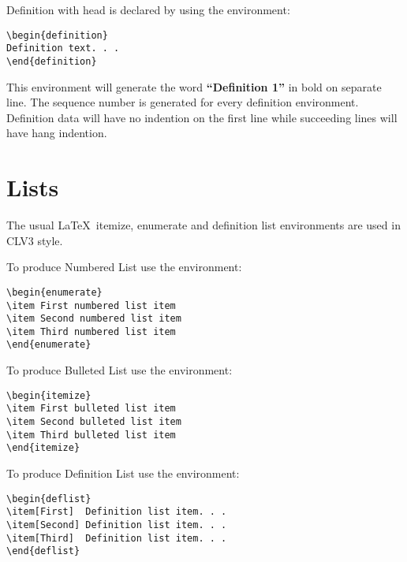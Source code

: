 \documentclass{clv3}
\begin{document}
Definition with head is declared by using the environment:
\\
\begin{verbatim}
\begin{definition}
Definition text. . .
\end{definition}
\end{verbatim}

This environment will generate the word {\bf ``Definition 1''} in bold on separate
line. The sequence number is generated for every definition environment. Definition
data will have no indention on the first line while succeeding lines will have hang
indention.

\section{Lists}

The usual \LaTeX\ itemize, enumerate and definition list environments are used
in CLV3 style.

To produce Numbered List use the environment:

\begin{verbatim}
\begin{enumerate}
\item First numbered list item
\item Second numbered list item
\item Third numbered list item
\end{enumerate}
\end{verbatim}

To produce Bulleted List use the environment:

\begin{verbatim}
\begin{itemize}
\item First bulleted list item
\item Second bulleted list item
\item Third bulleted list item
\end{itemize}
\end{verbatim}

To produce Definition List use the environment:

\begin{verbatim}
\begin{deflist}
\item[First]  Definition list item. . .
\item[Second] Definition list item. . .
\item[Third]  Definition list item. . .
\end{deflist}
\end{verbatim}
\end{document}
